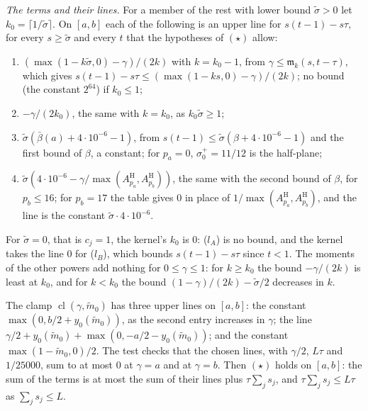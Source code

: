 \documentclass[11pt]{article}
\numberwithin{equation}{section}
\begin{document}
\emph{The terms and their lines.} For a member of the rest with lower bound $\tilde\sigma > 0$ let $k_0 = \lceil
1/\tilde\sigma \rceil$. On $[a, b]$ each of the following is an upper line for $s(t - 1) - s\tau$, for every $s \ge
\tilde\sigma$ and every $t$ that the hypotheses of $(\star)$ allow:
\begin{enumerate}
\item[($l_A$)] $(\max(1 - k\tilde\sigma, 0) - \gamma)/(2k)$ with $k = k_0 - 1$, from $\gamma \le \mathfrak
  m_k(s, t - \tau)$, which gives $s(t - 1) - s\tau \le (\max(1 - k s, 0) - \gamma)/(2k)$; no bound (the constant $2^{64}$)
  if $k_0 \le 1$;
\item[($l_B$)] $-\gamma/(2k_0)$, the same with $k = k_0$, as $k_0 \tilde\sigma \ge 1$;
\item[($l_C$)] $\tilde\sigma(\bar\beta(a) + 4 \cdot 10^{-6} - 1)$, from $s(t - 1) \le \tilde\sigma(\beta + 4 \cdot
  10^{-6} - 1)$ and the first bound of $\beta$, a constant; for $p_a = 0$, $\sigma^+_0 = 11/12$ is the half-plane;
\item[($l_W$)] $\tilde\sigma(4 \cdot 10^{-6} - \gamma/\max(A^{\mathrm H}_{p_a}, A^{\mathrm H}_{p_b}))$, the same with
  the second bound of $\beta$, for $p_b \le 16$; for $p_b = 17$ the table gives $0$ in place of $1/\max(A^{\mathrm
  H}_{p_a}, A^{\mathrm
  H}_{p_b})$, and the line is
  the constant $\tilde\sigma \cdot 4 \cdot 10^{-6}$.
\end{enumerate}
For $\tilde\sigma = 0$, that is $c_j = 1$, the kernel's $k_0$ is $0$: ($l_A$) is no bound, and the kernel takes the
line $0$ for ($l_B$),
which bounds $s(t - 1) - s\tau$ since $t < 1$. The moments of the other powers add nothing for $0 \le \gamma \le 1$:
for $k \ge k_0$ the bound $-\gamma/(2k)$ is least at $k_0$, and for $k < k_0$ the bound $(1 - \gamma)/(2k) -
\tilde\sigma/2$ decreases in $k$.

The clamp $\operatorname{cl}(\gamma, \tilde m_0)$ has three upper lines on $[a, b]$:
the constant $\max(0, b/2 + y_0(\tilde m_0))$, as the second entry
increases in $\gamma$; the line $\gamma/2 + y_0(\tilde m_0) + \max(0, -a/2 - y_0(\tilde m_0))$; and the constant
$\max(1 - \tilde m_0, 0)/2$. The test checks that the chosen lines, with $\gamma/2$, $L\tau$ and $1/25000$, sum to at
most $0$ at $\gamma = a$ and at $\gamma = b$. Then $(\star)$ holds on $[a, b]$: the sum of the terms is at most the sum
of their lines plus $\tau\sum_j s_j$, and $\tau \sum_j s_j \le L\tau$ as $\sum_j s_j \le L$.
\end{document}
